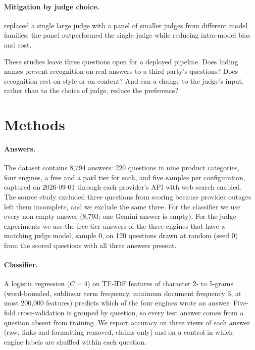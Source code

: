 \documentclass{article}
\begin{document}
\paragraph{Mitigation by judge choice.} \citet{verga2024replacing} replaced a single large judge with a panel of smaller judges from different model families; the panel outperformed the single judge while reducing intra-model bias and cost.

These studies leave three questions open for a deployed pipeline. Does hiding names prevent recognition on real answers to a third party's questions? Does recognition rest on style or on content? And can a change to the judge's input, rather than to the choice of judge, reduce the preference?

\section{Methods}
\label{sec:methods}

\paragraph{Answers.} The dataset \citep{productai2026divergence} contains 8,794 answers: 220 questions in nine product categories, four engines, a free and a paid tier for each, and five samples per configuration, captured on 2026-09-01 through each provider's API with web search enabled. The source study excluded three questions from scoring because provider outages left them incomplete, and we exclude the same three. For the classifier we use every non-empty answer (8,793; one Gemini answer is empty). For the judge experiments we use the free-tier answers of the three engines that have a matching judge model, sample 0, on 120 questions drawn at random (seed 0) from the scored questions with all three answers present.

\paragraph{Classifier.} A logistic regression ($C = 4$) on TF-IDF features of character 2- to 5-grams (word-bounded, sublinear term frequency, minimum document frequency 3, at most 200,000 features) predicts which of the four engines wrote an answer. Five-fold cross-validation is grouped by question, so every test answer comes from a question absent from training. We report accuracy on three views of each answer (raw, links and formatting removed, claims only) and on a control in which engine labels are shuffled within each question.
\end{document}
